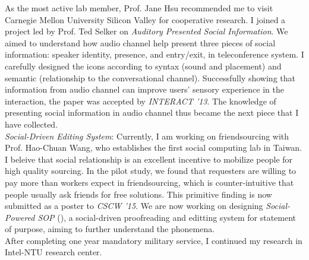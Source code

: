 \noindent
As the most active lab member,
Prof. Jane Hsu recommended me to visit Carnegie Mellon University Silicon Valley for cooperative research.
I joined a project led by Prof. Ted Selker on \textit{Auditory Presented Social Information}.
We aimed to understand how audio channel help present three pieces of social information: 
speaker identity, presence, and entry/exit, in teleconference system.
I carefully designed the icons according to syntax (sound and placement) and semantic (relationship to the conversational channel).
Successfully showing that information from audio channel can improve users' sensory experience in the interaction, 
the paper was accepted by \textit{INTERACT '13}. 
The knowledge of presenting social information in audio channel thus became the next piece that I have collected. \\


\noindent
\textit{Social-Driven Editing System}:
Currently, I am working on friendsourcing with Prof. Hao-Chuan Wang, who establishes the first social computing lab in Taiwan.
I beleive that social relationship is an excellent incentive to mobilize people for high quality sourcing.
In the pilot study, we found that requesters are willing to pay more than workers expect in friendsourcing,
which is counter-intuitive that people usually ask friends for free solutions.
This primitive finding is now submitted as a poster to \textit{CSCW '15}.
We are now working on designing \textit{Social-Powered SOP} (),
a social-driven proofreading and editting system for statement of purpose, aiming to further understand the phonemena. \\

\noindent
After completing one year mandatory military service, I continued my research in Intel-NTU research center. 


















